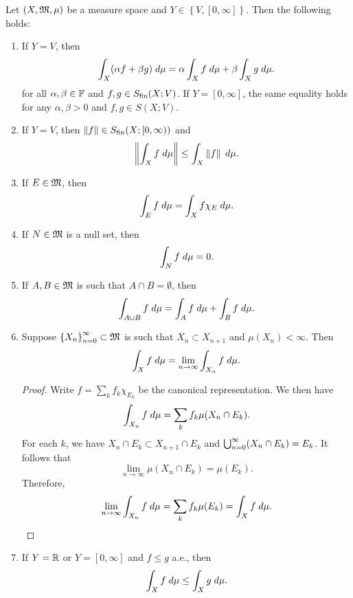 \documentclass[a4paper]{article}
\begin{document}
\begin{prop}
  Let $(X, \mathfrak{M}, \mu)$ be a measure space and 
  $Y \in \left\{ V, [0, \infty] \right\}$.
  Then the following holds: 
  \begin{enumerate}
    \item If $Y = V$, then 
    \[
      \int_X (\alpha f + \beta g) \; d \mu 
      = \alpha \int_X f \; d \mu + \beta \int_X
      g \; d \mu.
    \]
    for all $\alpha, \beta \in \mathbb{F}$ and 
    $f, g \in S_{\text{fin}}(X ; V)$. 
    If $Y = [0, \infty]$, the same equality holds 
    for any $\alpha, \beta > 0$ and $f, g \in S(X; V)$.

    \item If $Y = V$, then 
    $\left\lVert f\right\rVert \in S_{\text{fin}}(X; [0, \infty))$ 
    and 
    \[
      \left\lVert \int_X f \; d\mu\right\rVert \leq \int_X \left\lVert f\right\rVert \; d\mu.
    \]
    
    \item If $E \in \mathfrak{M}$, then 
    \[
      \int_E f \; d \mu = \int_X f \chi_E \; d \mu.
    \]

    \item If $N \in \mathfrak{M}$ is a null set, then 
    \[
      \int_N f \; d \mu = 0.
    \]

    \item If $A, B \in \mathfrak{M}$ is such that 
    $A \cap B = \emptyset$,
    then 
    \[
    \int_{A \cup B} f \; d\mu = \int_A f \; d\mu
    + \int_B f \; d\mu.
    \]

    \item Suppose $\left\{ X_n \right\}_{n=0}^\infty \subset \mathfrak{M}$ is such that 
    $X_n \subset X_{n+1}$ and $\mu(X_n) < \infty$. 
    Then 
    \[
      \int_X f \; d \mu = \lim_{n \to \infty} 
      \int_{X_n} f \; d\mu.
    \]

    \begin{proof}
      Write $f = \sum_k f_k \chi_{E_k}$ be the canonical 
      representation. We then have 
      \[
      \int_{X_n} f \; d\mu = \sum_k f_k \mu(X_n \cap E_k).
      \]
      For each $k$, we have 
      $X_n \cap E_k \subset X_{n+1} \cap E_k$ and 
      $\bigcup_{n=0}^\infty (X_n \cap E_k) = E_k$. 
      It follows that
      \[
        \lim_{n \to \infty} \mu(X_n \cap E_k) 
        = \mu(E_k).
      \]
      Therefore, 
      \[
      \lim_{n \to \infty} \int_{X_n} f \; d\mu
      = \sum_k f_k \mu(E_k) = \int_X f \; d\mu.
      \]
    \end{proof}

    \item If $Y = \mathbb{R}$ or $Y = [0, \infty]$ and 
    $f \leq g$ a.e., then 
    \[
    \int_X f \; d\mu \leq \int_X g \; d\mu.
    \]
  \end{enumerate}
\end{prop}
\end{document}
